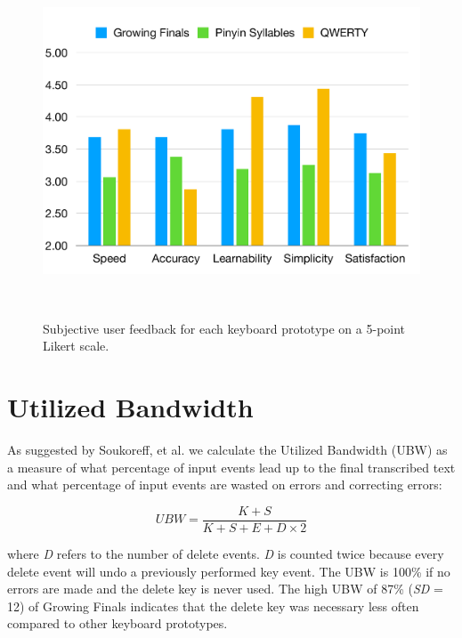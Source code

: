  
 
 \begin{figure}
  \centering
  \includegraphics[width=1\columnwidth]{figures/user_prefs}
  \caption{Subjective user feedback for each keyboard prototype on a 5-point Likert scale.}~\label{fig:figure5}
\end{figure}

 
 

\section{Utilized Bandwidth}
As suggested by Soukoreff, et al. \cite{Soukoreff:2003:MTE:642611.642632} we calculate the Utilized Bandwidth (UBW) as a measure of what percentage of input events lead up to the final transcribed text and what percentage of input events are wasted on errors and correcting errors:

\[ UBW = \frac{K + S}{K + S + E + D \times 2} \]

where \textit{D} refers to the number of delete events. \textit{D} is counted twice because every delete event will undo a previously performed key event. The UBW is 100\% if no errors are made and the delete key is never used. The high UBW of 87\% (\textit{SD} = 12) of Growing Finals indicates that the delete key was necessary less often compared to other keyboard prototypes.





